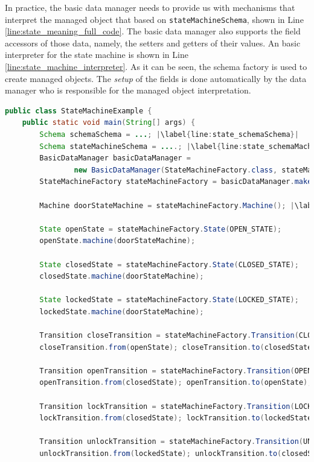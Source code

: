 In practice, the basic data manager needs to provide us with mechanisms that interpret the managed object that based on \texttt{stateMachineSchema}, shown in Line \ref{line:state_meaning_full_code}.
The basic data manager  also supports the field accessors of those data, namely, the setters and getters of their values.
An basic interpreter for the state machine is shown in Line \ref{line:state_machine_interpreter}.
As it can be seen, the schema factory is used to create managed objects.
The \textit{setup} of the fields is done automatically by the data manager who is responsible for the managed object interpretation.

\begin{sourcecode}
	\begin{lstlisting}[language=Java, escapechar=|]
public class StateMachineExample {
	public static void main(String[] args) {
		Schema schemaSchema = ...; |\label{line:state_schemaSchema}|
		Schema stateMachineSchema = ....; |\label{line:state_schemaMachineSchema}|
		BasicDataManager basicDataManager = 
				new BasicDataManager(StateMachineFactory.class, stateMachineSchema);  |\label{line:state_meaning_full_code}|
		StateMachineFactory stateMachineFactory = basicDataManager.make();

		Machine doorStateMachine = stateMachineFactory.Machine(); |\label{line:state_machine_creation_basic}|

		State openState = stateMachineFactory.State(OPEN_STATE);
		openState.machine(doorStateMachine);

		State closedState = stateMachineFactory.State(CLOSED_STATE);
		closedState.machine(doorStateMachine);

		State lockedState = stateMachineFactory.State(LOCKED_STATE);
		lockedState.machine(doorStateMachine);

		Transition closeTransition = stateMachineFactory.Transition(CLOSE_TRANSITION);
		closeTransition.from(openState); closeTransition.to(closedState);

		Transition openTransition = stateMachineFactory.Transition(OPEN_TRANSITION);
		openTransition.from(closedState); openTransition.to(openState);

		Transition lockTransition = stateMachineFactory.Transition(LOCK_TRANSITION);
		lockTransition.from(closedState); lockTransition.to(lockedState);

		Transition unlockTransition = stateMachineFactory.Transition(UNLOCK_TRANSITION);
		unlockTransition.from(lockedState); unlockTransition.to(closedState);


\end{lstlisting}
\end{sourcecode}
